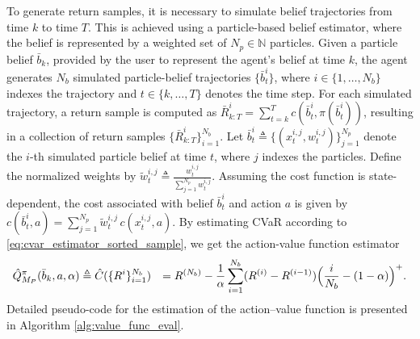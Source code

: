 \documentclass[acmlarge, manuscript, screen, review, natbib=false, oneside]{acmart}
\begin{document}
To generate return samples, it is necessary to simulate belief trajectories from time $k$ to time $T$. This is achieved using a particle-based belief estimator, where the belief is represented by a weighted set of $N_p \in \mathbb{N}$ particles. Given a particle belief $\bar{b}_k$, provided by the user to represent the agent's belief at time $k$, the agent generates $N_b$ simulated particle-belief trajectories $\{\bar{b}_t^i\}$, where $i \in \{1, \dots, N_b\}$ indexes the trajectory and $t \in \{k, \dots, T\}$ denotes the time step. For each simulated trajectory, a return sample is computed as $\bar{R}^i_{k:T} = \sum_{t=k}^T c(\bar{b}_t^i, \pi(\bar{b}_t^i))$, resulting in a collection of return samples $\{\bar{R}_{k:T}^i\}_{i=1}^{N_b}$. Let $\bar{b}_t^i \triangleq \{(x_t^{i,j}, w_t^{i,j})\}_{j=1}^{N_p}$ denote the $i$-th simulated particle belief at time $t$, where $j$ indexes the particles. Define the normalized weights by $\tilde{w}_t^{i,j} \triangleq \frac{w_t^{i,j}}{\sum_{j=1}^{N_p} w_t^{i,j}}$. Assuming the cost function is state-dependent, the cost associated with belief $\bar{b}_t^i$ and action $a$ is given by
$
c(\bar{b}_t^i, a) = \sum_{j=1}^{N_p} \tilde{w}_t^{i,j} \, c(x_t^{i,j}, a).
$ 
By estimating CVaR according to \eqref{eq:cvar_estimator_sorted_sample}, we get the action-value function estimator
\begin{equation}
	\begin{aligned}
		&\hat{Q}_{M_P}^\pi (\bar{b}_k, a, \alpha) \triangleq \hat{C}(\{R^i\}_{i=1}^{N_b}) 
		&=R^{(N_b)}-\frac{1}{\alpha}\sum_{i=1}^{N_b} (R^{(i)}-R^{(i-1)})\Bigl(\frac{i}{N_b}-(1-\alpha) \Bigr)^+.
	\end{aligned}
\end{equation}
Detailed pseudo-code for the estimation of the action–value function is presented in Algorithm \ref{alg:value_func_eval}.
\end{document}
